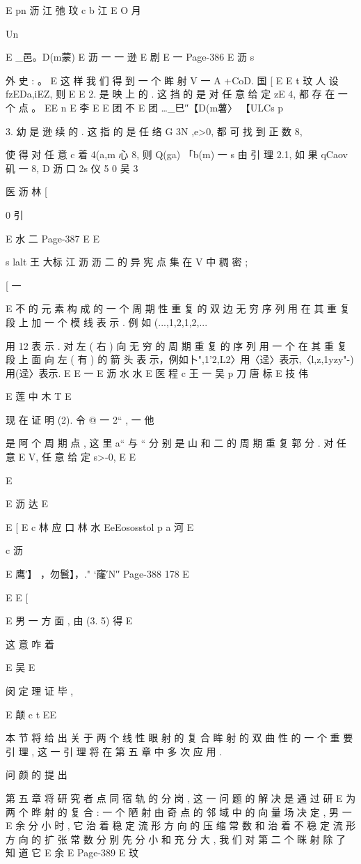 {{{{{{{{{{{{{{{E pn 沥 江 弛 玟 c
b
江
E O 月

Un

E _邑。D(m蒙)
E 沥 一 一 逊
E 剧
E 一
Page-386
E 沥 s

外 史 : 。
E
这 样 我 们 得 到 一 个 眸 射 V 一 A +CoD.
国 [
E
E t
玟
人 设 fzEDa,iEZ, 则
E
E
2. 是 映 上 的 . 这 挡 的 是 对 任 意 给 定 zE 4, 都 存 在 一 个 点 。
EE n
E 李
E
E 团 不
E
团 …_巳″【D(m薯〉 【ULCs p

3. 幼 是 逊 续 的 . 这 指 的 是 任 络 G 3N ,e>0, 都 可 找 到 正 数 8,

使 得 对 任 意
c
着 4(a,m 心 8, 则 Q(ga) 「b(m) 一 s 由 引 理 2.1, 如 果 qCaov 矶 一 8,
D 沥 口 2s 仪
5
0 吴 3

医 沥 林 [

0 引

E 水 二
Page-387
E E

s lalt 王 大标 江 沥 沥 二
的 异 宪 点 集 在 V 中 稠 密 ;

[ 一

E 不
的 元 素 构 成 的 一 个 周 期 性 重 复 的 双 边 无 穷 序 列 用 在 其 重 复 段 上 加
一 个 模 线 表 示 . 例 如 (...,1,2,1,2,...} 用 {12} 表 示 . 对 左 ( 右 ) 向 无
穷 的 周 期 重 复 的 序 列 用 一 个 在 其 重 复 段 上 面 向 左 ( 有 ) 的 箭 头 表
示，例如卜",1'2,L2〉用〈迳〉表示,〈l,z,1yzy"-)用(迳〉表示. E
E 一
E 沥 水 水
E 医 程 c 王 一 吴 p 刀 唐 标
E 技
伟

E 莲 中 木 T
E

现 在 证 明 (2). 令 @ 一 {2“ }, 一 他 } 是 阿 个 周 期 点 , 这 里 a“ 与
“ 分 别 是 山 和 二 的 周 期 重 复 郭 分 . 对 任 意 E V, 任 意 给 定 s>-0,
E E

E

E 沥 达
E

E [
E c 林 应 口 林 水
EeEososstol p a 河
E

c 沥

E {鹰′】 ，勿鬟】，." `窿′N′}′
Page-388
178 E

E
E
[

E
男 一 方 面 , 由 (3. 5) 得
E

这 意 咋 着

E 吴
E

闵
定 理 证 毕 ,

E 颠 c t EE

本 节 将 给 出 关 于 两 个 线 性 眼 射 的 复 合 眸 射 的 双 曲 性 的 一 个 重
要 引 理 , 这 一 引 理 将 在 第 五 章 中 多 次 应 用 .

问 颜 的 提 出

第 五 章 将 研 究 者 点 同 宿 轨 的 分 岗 , 这 一 问 题 的 解 决 是 通 过 研
E
为 两 个 晔 射 的 复 合 : 一 个 陋 射 由 奇 点 的 邻 域 中 的 向 量 场 决 定 , 男 一
E
余
分 小 时 , 它 治 着 稳 定 流 形 方 向 的 压 缩 常 数 和 治 着 不 稳 定 流 形 方 向
的 扩 张 常 数 分 别 先 分 小 和 充 分 大 , 我 们 对 第 二 个 眯 射 除 了 知 道 它
E
余
E
Page-389
E 玟

}}}}}}}}}}}}}
